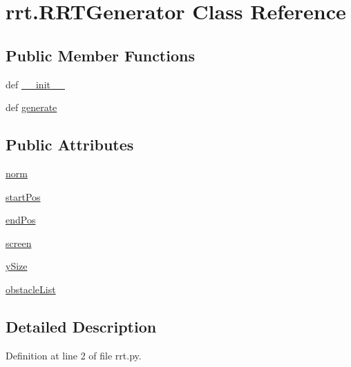 \hypertarget{classrrt_1_1RRTGenerator}{\section{rrt.\-R\-R\-T\-Generator Class Reference}
\label{classrrt_1_1RRTGenerator}
}
\subsection*{Public Member Functions}
\begin{DoxyCompactItemize}
\item 
def \hyperlink{classrrt_1_1RRTGenerator_a399ed91ecb94dbdd9c85c01632afbd80}{\-\_\-\-\_\-init\-\_\-\-\_\-}
\item 
def \hyperlink{classrrt_1_1RRTGenerator_af01d782ba0ffdeca12b5415c370095e8}{generate}
\end{DoxyCompactItemize}
\subsection*{Public Attributes}
\begin{DoxyCompactItemize}
\item 
\hyperlink{classrrt_1_1RRTGenerator_a570c460f0b9898224869f5075f2d0a68}{norm}
\item 
\hyperlink{classrrt_1_1RRTGenerator_a3a46d854a25cfb8db4235df36a09eeeb}{start\-Pos}
\item 
\hyperlink{classrrt_1_1RRTGenerator_a97423e9669ed42aa79510e45f99e9e23}{end\-Pos}
\item 
\hyperlink{classrrt_1_1RRTGenerator_ad0cc9ff4a66a1e9f8210270232b250a4}{screen}
\item 
\hyperlink{classrrt_1_1RRTGenerator_acf8af92ceb0cae904278159b4b8c5635}{y\-Size}
\item 
\hyperlink{classrrt_1_1RRTGenerator_aff6d3b391980c5951446c10342d417c8}{obstacle\-List}
\end{DoxyCompactItemize}


\subsection{Detailed Description}


Definition at line 2 of file rrt.\-py.



